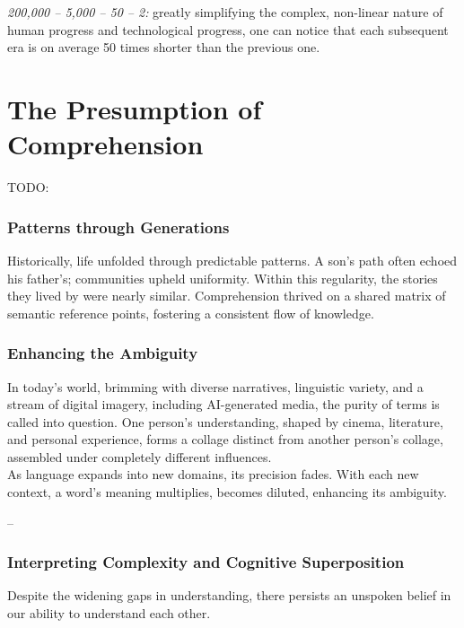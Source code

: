\documentclass[11pt,a4]{article}
\begin{document}
\par
\textit{200,000 – 5,000 – 50 – 2:}
greatly simplifying the complex, non-linear nature of human progress and technological progress, one can notice that each subsequent era is on average 50 times shorter than the previous one.





\section{The Presumption of Comprehension}
    TODO:

    \subsubsection{Patterns through Generations}
        \par
        Historically, life unfolded through predictable patterns. A son's path often echoed his father's; communities upheld uniformity. Within this regularity, the stories they lived by were nearly similar. Comprehension thrived on a shared matrix of semantic reference points, fostering a consistent flow of knowledge.

    \subsubsection{Enhancing the Ambiguity}

        In today's world, brimming with diverse narratives, linguistic variety, and a stream of digital imagery,  including AI-generated media, the purity of terms is called into question. One person's understanding, shaped by cinema, literature, and personal experience, forms a collage distinct from another person's collage, assembled under completely different influences. \\

         As language expands into new domains, its precision fades. With each new context, a word's meaning multiplies, becomes diluted, enhancing its ambiguity.

--
        \subsubsection{Interpreting Complexity and Cognitive Superposition}

        \par
        Despite the widening gaps in understanding, there persists an unspoken belief in our ability to understand each other.
\end{document}

